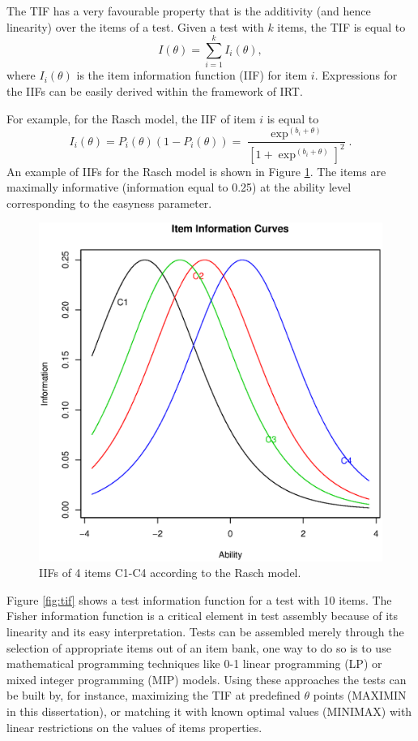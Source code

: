 The TIF has a very favourable property that is the additivity (and hence linearity) over the items of a test.
Given a test with $k$ items, the TIF is equal to
\begin{equation}
I(\theta)=\sum_{i=1}^k{I_i(\theta)},
\end{equation}
where $I_i(\theta)$ is the item information function (IIF) for item $i$. Expressions for the IIFs can be easily derived within the framework of IRT. 

For example, for the Rasch model, the IIF of item $i$ is equal to
\begin{equation}\label{eq:infofun2pl}
I_i(\theta)=P_i(\theta)(1-P_i(\theta))=\frac{\exp^{(b_i+\theta)}}{[1+\exp^{(b_i+\theta)}]^2}.
\end{equation}
An example of IIFs for the Rasch model is shown in Figure \ref{fig:iif}. The items are maximally informative (information equal to 0.25) at the ability level corresponding to the easyness parameter.

\begin{figure}[h]
	\centering
	\includegraphics[scale=0.5]{iif.eps}
	\caption{IIFs of 4 items C1-C4 according to the Rasch model.}
	\label{fig:iif}
\end{figure}

Figure \ref{fig:tif} shows a test information function for a test with 10 items.
The Fisher information function is a critical element in test assembly because of its linearity and its easy interpretation.
Tests can be assembled merely through the selection of appropriate items out of an item bank, one way to do so is to use mathematical programming techniques like 0-1 linear programming (LP) or mixed integer programming (MIP) models.
Using these approaches the tests can be built by, for instance, maximizing the TIF at predefined $\theta$ points (MAXIMIN in this dissertation), or matching it with known optimal values (MINIMAX) with linear restrictions on the values of items properties.

